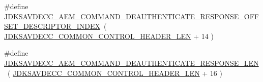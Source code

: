 \begin{DoxyCompactItemize}
\item 
\#define \hyperlink{group__command__deauthenticate__response_ga63ec2c57db1e68e120980d059da90ec0}{J\+D\+K\+S\+A\+V\+D\+E\+C\+C\+\_\+\+A\+E\+M\+\_\+\+C\+O\+M\+M\+A\+N\+D\+\_\+\+D\+E\+A\+U\+T\+H\+E\+N\+T\+I\+C\+A\+T\+E\+\_\+\+R\+E\+S\+P\+O\+N\+S\+E\+\_\+\+O\+F\+F\+S\+E\+T\+\_\+\+D\+E\+S\+C\+R\+I\+P\+T\+O\+R\+\_\+\+I\+N\+D\+EX}~( \hyperlink{group__jdksavdecc__avtp__common__control__header_gaae84052886fb1bb42f3bc5f85b741dff}{J\+D\+K\+S\+A\+V\+D\+E\+C\+C\+\_\+\+C\+O\+M\+M\+O\+N\+\_\+\+C\+O\+N\+T\+R\+O\+L\+\_\+\+H\+E\+A\+D\+E\+R\+\_\+\+L\+EN} + 14 )
\item 
\#define \hyperlink{group__command__deauthenticate__response_ga2627959675f864e4bd94cd83999060c1}{J\+D\+K\+S\+A\+V\+D\+E\+C\+C\+\_\+\+A\+E\+M\+\_\+\+C\+O\+M\+M\+A\+N\+D\+\_\+\+D\+E\+A\+U\+T\+H\+E\+N\+T\+I\+C\+A\+T\+E\+\_\+\+R\+E\+S\+P\+O\+N\+S\+E\+\_\+\+L\+EN}~( \hyperlink{group__jdksavdecc__avtp__common__control__header_gaae84052886fb1bb42f3bc5f85b741dff}{J\+D\+K\+S\+A\+V\+D\+E\+C\+C\+\_\+\+C\+O\+M\+M\+O\+N\+\_\+\+C\+O\+N\+T\+R\+O\+L\+\_\+\+H\+E\+A\+D\+E\+R\+\_\+\+L\+EN} + 16 )
\end{DoxyCompactItemize}
